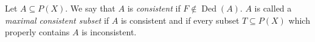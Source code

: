 Let $A \subseteq P(X)$. We say that $A$ is \emph{consistent} if $F \notin \operatorname{Ded}(A)$. $A$ is called a \emph{maximal consistent subset} if $A$ is consistent and if every subset $T \subseteq P(X)$ which properly contains $A$ is inconsistent.
